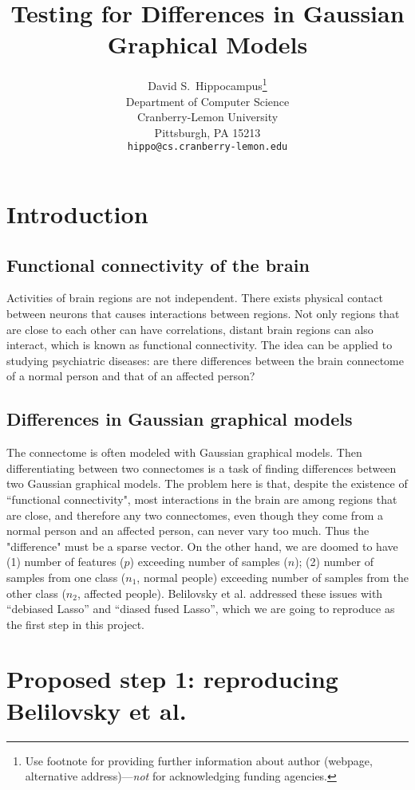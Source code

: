 \documentclass{article}
\title{Testing for Differences in Gaussian Graphical Models}
\author{
  David S.~Hippocampus\thanks{Use footnote for providing further
    information about author (webpage, alternative
    address)---\emph{not} for acknowledging funding agencies.} \\
  Department of Computer Science\\
  Cranberry-Lemon University\\
  Pittsburgh, PA 15213 \\
  \texttt{hippo@cs.cranberry-lemon.edu} \\
}
\begin{document}

\maketitle

\section{Introduction}

\subsection{Functional connectivity of the brain}
Activities of brain regions are not independent. There exists physical contact between neurons that causes interactions between regions. Not only regions that are close to each other can have correlations, distant brain regions can also interact, which is known as functional connectivity. The idea can be applied to studying psychiatric diseases: are there differences between the brain connectome of a normal person and that of an affected person?  

\subsection{Differences in Gaussian graphical models}
The connectome is often modeled with Gaussian graphical models. Then differentiating between two connectomes is a task of finding differences between two Gaussian graphical models. The problem here is that, despite the existence of ``functional connectivity", most interactions in the brain are among regions that are close, and therefore any two connectomes, even though they come from a normal person and an affected person, can never vary too much. Thus the "difference" must be a sparse vector. On the other hand, we are doomed to have (1) number of features ($p$) exceeding number of samples ($n$); (2) number of samples from one class ($n_1$, normal people) exceeding number of samples from the other class ($n_2$, affected people). Belilovsky et al. addressed these issues with ``debiased Lasso'' and ``diased fused Lasso'', which we are going to reproduce as the first step in this project.

\section{Proposed step 1: reproducing Belilovsky et al.}
\end{document}
